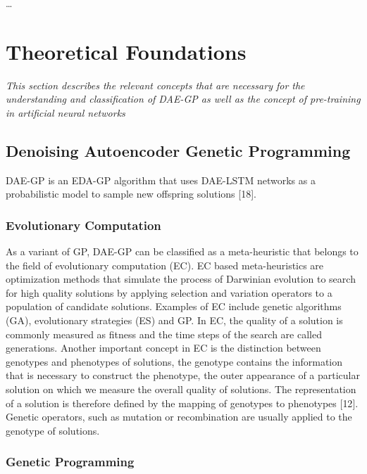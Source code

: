 \documentclass[
  11pt,
]{article}
\begin{document}
\ldots{}

\hypertarget{theoretical-foundations}{%
\section{Theoretical Foundations}\label{theoretical-foundations}}

\emph{This section describes the relevant concepts that are necessary
for the understanding and classification of DAE-GP as well as the
concept of pre-training in artificial neural networks}

\hypertarget{denoising-autoencoder-genetic-programming}{%
\subsection{Denoising Autoencoder Genetic
Programming}\label{denoising-autoencoder-genetic-programming}}

DAE-GP is an EDA-GP algorithm that uses DAE-LSTM networks as a
probabilistic model to sample new offspring solutions {[}18{]}.

\hypertarget{evolutionary-computation}{%
\subsubsection{Evolutionary
Computation}\label{evolutionary-computation}}

As a variant of GP, DAE-GP can be classified as a meta-heuristic that
belongs to the field of evolutionary computation (EC). EC based
meta-heuristics are optimization methods that simulate the process of
Darwinian evolution to search for high quality solutions by applying
selection and variation operators to a population of candidate
solutions. Examples of EC include genetic algorithms (GA), evolutionary
strategies (ES) and GP. In EC, the quality of a solution is commonly
measured as fitness and the time steps of the search are called
generations. Another important concept in EC is the distinction between
genotypes and phenotypes of solutions, the genotype contains the
information that is necessary to construct the phenotype, the outer
appearance of a particular solution on which we measure the overall
quality of solutions. The representation of a solution is therefore
defined by the mapping of genotypes to phenotypes {[}12{]}. Genetic
operators, such as mutation or recombination are usually applied to the
genotype of solutions.

\hypertarget{genetic-programming}{%
\subsubsection{Genetic Programming}\label{genetic-programming}}
\end{document}
